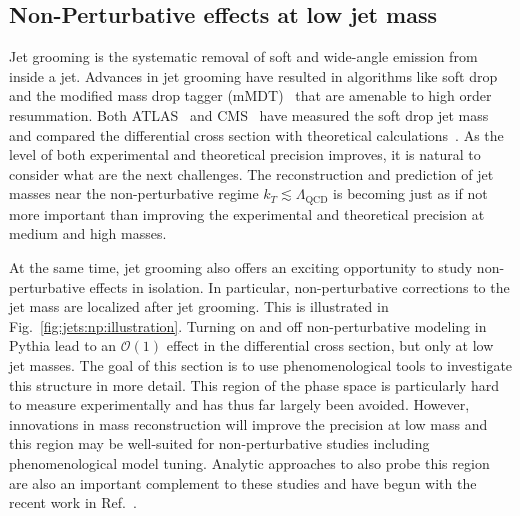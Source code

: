 \documentclass[11pt]{cernrep}
\begin{document}
\subsection{Non-Perturbative effects at low jet mass}
\label{sec:jets:np}

Jet grooming is the systematic removal of soft and wide-angle emission from inside a jet.  Advances in jet grooming have resulted in algorithms like soft drop and the modified mass drop tagger (mMDT)~\cite{Larkoski:2014wba,Dasgupta:2013ihk} that are amenable to high order resummation.   Both ATLAS~\cite{Aaboud:2017qwh,Aad:2019vyi} and CMS~\cite{Sirunyan:2018xdh} have measured the soft drop jet mass and compared the differential cross section with theoretical calculations~\cite{Frye:2016aiz,Frye:2016okc,Marzani:2017mva,Marzani:2017kqd,Kang:2018vgn,Kang:2018jwa,Baron:2018nfz,Kardos:2018kth}.  As the level of both experimental and theoretical precision improves, it is natural to consider what are the next challenges.  The reconstruction and prediction of jet masses near the non-perturbative regime $k_T\lesssim \Lambda_\text{QCD}$ is becoming just as if not more important than improving the experimental and theoretical precision at medium and high masses.

At the same time, jet grooming also offers an exciting opportunity to study non-perturbative effects in isolation.  In particular, non-perturbative corrections to the jet mass are localized after jet grooming.  This is illustrated in Fig.~\ref{fig:jets:np:illustration}.  Turning on and off non-perturbative modeling in Pythia lead to an $\mathcal{O}(1)$ effect in the differential cross section, but only at low jet masses.  The goal of this section is to use phenomenological tools to investigate this structure in more detail.  This region of the phase space is particularly hard to measure experimentally and has thus far largely been avoided.  However, innovations in mass reconstruction will improve the precision at low mass and this region may be well-suited for non-perturbative studies including phenomenological model tuning.  Analytic approaches to also probe this region are also an important complement to these studies and have begun with the recent work in Ref.~\cite{Hoang:2019ceu}.
\end{document}
